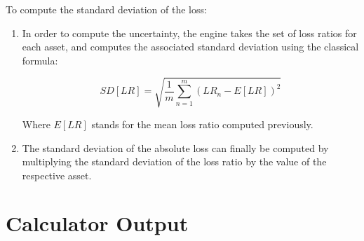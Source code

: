 To compute the standard deviation of the loss:

\begin{enumerate}

\item In order to compute the uncertainty, the engine takes the set of loss ratios for each asset, and computes the associated standard deviation using the classical formula:

\begin{equation}
SD[LR]=\sqrt{  \frac{1}{m}\sum_{n=1}^m{(LR_n-E[LR])^2} }
\end{equation}

Where $E[LR]$ stands for the mean loss ratio computed previously.

\item The standard deviation of the absolute loss can finally be computed by multiplying the standard deviation of the loss ratio by the value of the respective asset.

\end{enumerate}

\section{Calculator Output}
